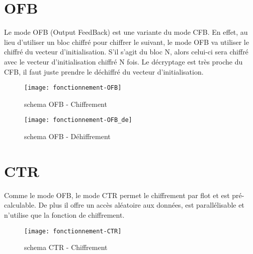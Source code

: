 \section{OFB}
Le mode OFB (Output FeedBack) est une variante du mode CFB. En effet, au lieu d'utiliser un bloc chiffré pour chiffrer le suivant, le mode OFB va utiliser le chiffré du vecteur d'initialisation. S'il s'agit du bloc N, alors celui-ci sera chiffré avec le vecteur d'initialisation chiffré N fois. Le décryptage est très proche du CFB, il faut juste prendre le déchiffré du vecteur d'initialisation.


\begin{figure}[!h]
  \centering
  \texttt{[image: fonctionnement-OFB]}
  \caption{schema OFB - Chiffrement}
  \label{schema OFB - Chiffrement}
\end{figure}

\begin{figure}[!h]
  \centering
  \texttt{[image: fonctionnement-OFB\_de]}
  \caption{schema OFB - Déhiffrement}
  \label{schema OFB - Déchiffrement}
\end{figure}

\section{CTR}
Comme le mode OFB, le mode CTR permet le chiffrement par flot et est pré-calculable. De plus il offre un accès aléatoire aux données, est parallélisable et n'utilise que la fonction de chiffrement. 

\begin{figure}[!h]
  \centering
  \texttt{[image: fonctionnement-CTR]}
  \caption{schema CTR - Chiffrement}
  \label{schema CTR - Chiffrement}
\end{figure}


